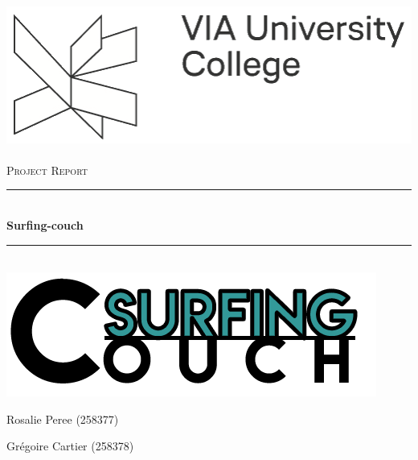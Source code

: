 \newcommand{\HRule}{\rule{\linewidth}{0.5mm}}

\begin{titlepage}
  \begin{sffamily}
  \begin{center}

    
    \includegraphics[scale=0.7]{img/via_logo.png}~\\[1.5cm]

    \textsc{\Large Project Report }\\[1cm]

    \HRule \\[0.4cm]
    { \huge \bfseries Surfing-couch\\[0.4cm] }

    \HRule \\[3cm]
    \includegraphics[scale=0.75]{img/logo.png}\\[1.3cm]

    \begin{minipage}{0.35\textwidth}
      \begin{flushleft} \large
        Rosalie Peree \textsc{(258377)}\\
      \end{flushleft}
    \end{minipage}
    \begin{minipage}{0.35\textwidth}
      \begin{flushright} \large
        Grégoire Cartier \textsc{(258378)}\\
      \end{flushright}
    \end{minipage}\\[1.5cm]
    

\end{center}
\end{sffamily}
\end{titlepage}
